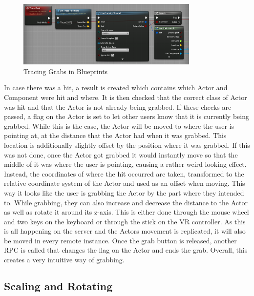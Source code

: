 \begin{figure}[htpb]
	\centering
	\includegraphics[width=0.8\textwidth]{fig/LineTracing2.png}
	\caption[Tracing Grabs in Blueprints]{Tracing Grabs in Blueprints\protect}
	\label{fig:LineTracing}
\end{figure}

In case there was a hit, a result is created which contains which Actor and Component were hit and where. It is then checked that the correct class of Actor was hit and that the Actor is not already being grabbed. If these checks are passed, a flag on the Actor is set to let other users know that it is currently being grabbed. While this is the case, the Actor will be moved to where the user is pointing at, at the distance that the Actor had when it was grabbed. This location is additionally slightly offset by the position where it was grabbed. If this was not done, once the Actor got grabbed it would instantly move so that the middle of it was where the user is pointing, causing a rather weird looking effect. Instead, the coordinates of where the hit occurred are taken, transformed to the relative coordinate system of the Actor and used as an offset when moving. This way it looks like the user is grabbing the Actor by the part where they intended to. While grabbing, they can also increase and decrease the distance to the Actor as well as rotate it around its z-axis. This is either done through the mouse wheel and two keys on the keyboard or through the stick on the VR controller. As this is all happening on the server and the Actors movement is replicated, it will also be moved in every remote instance. Once the grab button is released, another \acs{RPC} is called that changes the flag on the Actor and ends the grab. Overall, this creates a very intuitive way of grabbing.

\subsection{Scaling and Rotating}

